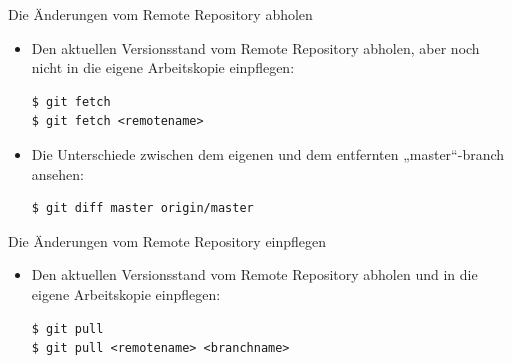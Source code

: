 \begin{frame}[fragile]{Die Änderungen vom Remote Repository abholen}
  \begin{itemize}
    \item Den aktuellen Versionsstand vom Remote Repository abholen, aber noch nicht in die eigene Arbeitskopie einpflegen:
    \begin{lstlisting}
$ git fetch
$ git fetch <remotename>
    \end{lstlisting}
    \item Die Unterschiede zwischen dem eigenen und dem entfernten „master“-branch ansehen:
    \begin{lstlisting}
$ git diff master origin/master
    \end{lstlisting}
  \end{itemize}
\end{frame}

\begin{frame}[fragile]{Die Änderungen vom Remote Repository einpflegen}
  \begin{itemize}
    \item Den aktuellen Versionsstand vom Remote Repository abholen und in die eigene Arbeitskopie einpflegen:
    \begin{lstlisting}
$ git pull
$ git pull <remotename> <branchname>
    \end{lstlisting}
  \end{itemize}
\end{frame}

